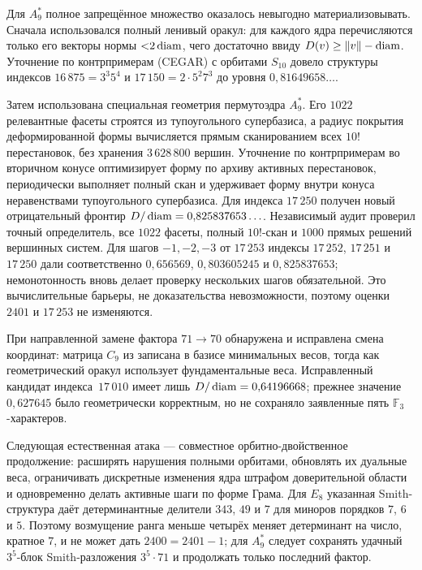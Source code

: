 Для $A_9^*$ полное запрещённое множество оказалось невыгодно
материализовывать. Сначала использовался полный ленивый оракул: для каждого
ядра перечисляются только его векторы нормы ${<}2\operatorname{diam}$, чего достаточно ввиду
$D(v)\ge\lVert v\rVert-\operatorname{diam}$. Уточнение по контрпримерам (CEGAR) с орбитами $S_{10}$ довело структуры
индексов $16\,875=3^3 5^4$ и $17\,150=2\cdot5^2 7^3$ до уровня
$0{,}81649658\ldots$.

Затем использована специальная геометрия пермутоэдра $A_9^*$. Его $1022$
релевантные фасеты строятся из тупоугольного супербазиса, а радиус покрытия
деформированной формы вычисляется прямым сканированием всех $10!$ перестановок,
без хранения $3\,628\,800$ вершин. Уточнение по контрпримерам во вторичном конусе оптимизирует форму
по архиву активных перестановок, периодически выполняет полный скан и
удерживает форму внутри конуса неравенствами тупоугольного супербазиса. Для индекса
$17\,250$ получен новый отрицательный фронтир
$D/\operatorname{diam}=0{,}825837653\ldots$. Независимый аудит проверил точный определитель,
все $1022$ фасеты, полный $10!$-скан и $1000$ прямых решений вершинных систем.
Для шагов $-1,-2,-3$ от $17\,253$ индексы $17\,252$, $17\,251$ и $17\,250$ дали
соответственно $0{,}656569$, $0{,}803605245$ и $0{,}825837653$;
немонотонность вновь делает проверку нескольких шагов обязательной. Это
вычислительные барьеры, не доказательства невозможности, поэтому оценки
$2401$ и $17\,253$ не изменяются.

При направленной замене фактора $71\to70$ обнаружена и исправлена смена
координат: матрица $C_9$ из \cite{ABPR} записана в базисе минимальных весов,
тогда как геометрический оракул использует фундаментальные веса. Исправленный
кандидат индекса~$17\,010$ имеет лишь $D/\operatorname{diam}=0{,}64196668$; прежнее значение
$0{,}627645$ было геометрически корректным, но не сохраняло заявленные пять
$\mathbb F_3$-характеров.

Следующая естественная атака --- совместное орбитно-двойственное продолжение:
расширять нарушения полными орбитами, обновлять их дуальные веса, ограничивать
дискретные изменения ядра штрафом доверительной области и одновременно делать активные
шаги по форме Грама. Для $E_8$ указанная Smith-структура даёт детерминантные
делители $343$, $49$ и $7$
для миноров порядков $7$, $6$ и $5$. Поэтому возмущение ранга меньше четырёх
меняет детерминант на число, кратное $7$, и не может дать
$2400=2401-1$; для $A_9^*$ следует
сохранять удачный $3^5$-блок Smith-разложения $3^5\cdot71$ и продолжать только
последний фактор.

